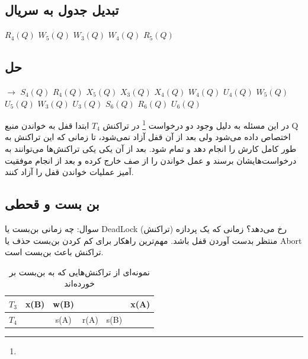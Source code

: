 \documentclass[a4paper]{article}
\begin{document}
\subsection*{تبدیل جدول به سریال}

\begin{LTR}
    $R_{4}(Q)$ $W_{5}(Q)$ $W_{3}(Q)$ $W_{4}(Q)$ $R_{5}(Q)$
\end{LTR}

\subsection*{حل}

\begin{LTR}
    \centering
    $\rightarrow$ 
    $S_{4}(Q)$ $R_{4}(Q)$ 
    $X_{5}(Q)$ $X_{3}(Q)$
    $X_{4}(Q)$ $W_{4}(Q)$ $U_{4}(Q)$
    $W_{5}(Q)$ $U_{5}(Q)$
    $W_{3}(Q)$ $U_{3}(Q)$
    $S_{6}(Q)$ $R_{6}(Q)$ $U_{6}(Q)$
\end{LTR}

در این مسئله به دلیل وجود دو درخواست \footnote{} در تراکنش $T_4$
ابتدا قفل به خواندن منبع Q اختصاص داده می‌شود ولی بعد از آن قفل آزاد نمی‌شود، تا
زمانی که این تراکنش به طور کامل کارش را انجام دهد و تمام شود. بعد از آن یکی یکی
تراکنش‌ها می‌توانند به درخواست‌هایشان برسند و عمل خواندن را از صف خارج کرده و
بعد از انجام موفقیت آمیز عملیات خواندن قفل را آزاد کنند.

\newpage

\subsection{بن بست و قحطی}

سوال: چه زمانی بن‌بست یا DeadLock رخ می‌دهد؟ زمانی که یک پردازه (تراکنش) منتظر
بدست آوردن قفل باشد. مهم‌ترین راهکار برای کم کردن بن‌بست حذف یا Abort تراکنش
باعث بن‌بست است.

\begin{LTR}
    \begin{table}[h]
        \begin{RTL}
            \caption{نمونه‌ای از تراکنش‌هایی که به بن‌بست بر خورده‌اند}
        \end{RTL}
        \centering
            \begin{tabular}{c|c|c|c|c|c}
                $T_{3}$ & x(B) & w(B) & & & x(A) \\ \hline
                $T_{4}$ & & s(A) & r(A) & s(B) & \\
            \end{tabular}
    \end{table}
\end{LTR}
\end{document}
